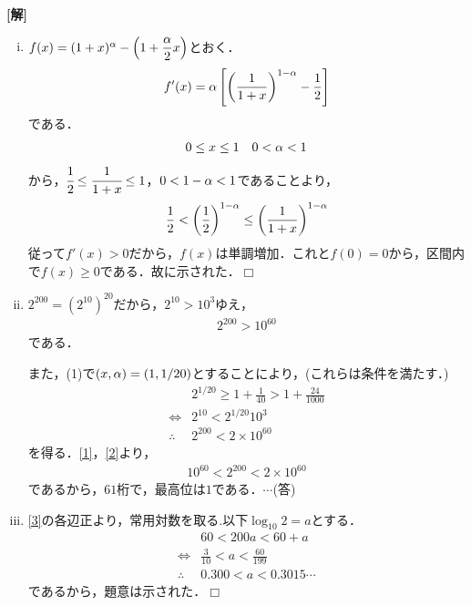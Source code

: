\documentclass[a4j]{jarticle}
\begin{document}
\setlength{\columnseprule}{0.4pt}
\begin{multicols}{2}
{\bf[解]} 
     \begin{enumerate}[(i)]
     \item $f(x)=(1+x)^\alpha-\left(1+\dfrac{\alpha}{2}x\right)$とおく．
          \[f'(x)=\alpha\left[\left(\frac{1}{1+x}\right)^{1-\alpha}-\frac{1}{2}\right]\]
     である．
          \begin{align*}
          &0\le x\le1 &0<\alpha<1
          \end{align*}
     から，$\cfrac{1}{2}\le\cfrac{1}{1+x}\le1$，$0<1-\alpha<1$であることより，
          \[\frac{1}{2}<\left(\frac{1}{2}\right)^{1-\alpha}\le\left(\frac{1}{1+x}\right)^{1-\alpha}\]
     従って$f'(x)>0$だから，$f(x)$は単調増加．これと$f(0)=0$から，区間内で$f(x)\ge0$である．故に示された．$\Box$
     \item $2^{200}=(2^{10})^{20}$だから，$2^{10}>10^3$ゆえ，
          \begin{align}
          2^{200}>10^{60}\label{1}
          \end{align}
      である．
              
     また，(1)で$(x,\alpha)=(1,1/20)$とすることにより，(これらは条件を満たす．)
          \begin{align}
          &2^{1/20}\ge 1+\frac{1}{40}>1+\frac{24}{1000} \nonumber\\
          　\Longleftrightarrow &2^{10}<2^{1/20}10^3 \nonumber\\
          \therefore \ &2^{200}<2×10^{60} \label{2}
          \end{align}
     を得る．\eqref{1}，\eqref{2}より，
          \begin{align}
          10^{60}<2^{200}<2×10^{60}\label{3}
          \end{align}
      であるから，$61$桁で，最高位は$1$である．$\cdots$(答)
      \item \eqref{3}の各辺正より，常用対数を取る.以下$\log_{10}2=a$とする．
           \begin{align*}
           &60<200a<60+a  \\
           \Longleftrightarrow &\frac{3}{10}<a<\frac{60}{199} \\
          \therefore \ &0.300<a<0.3015\cdots
           \end{align*}
      であるから，題意は示された．$\Box$   
     \end{enumerate}
\newpage
\end{multicols}
\end{document}
